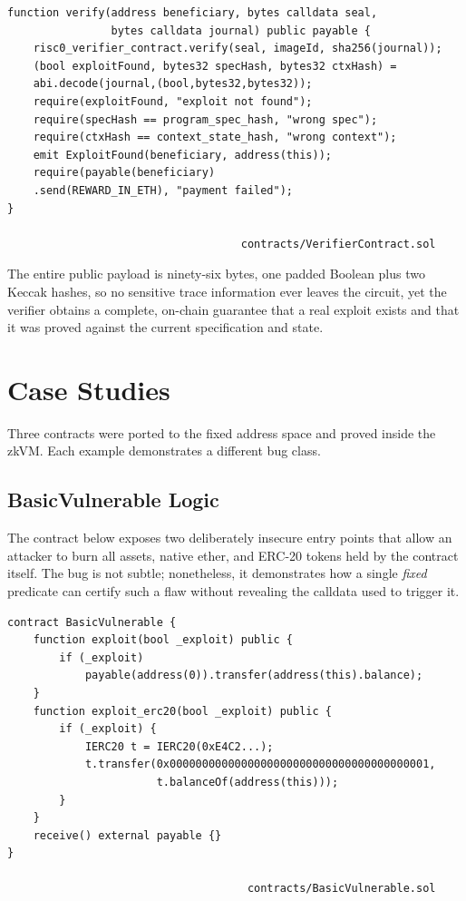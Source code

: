\begin{lstlisting}[caption={[VerifierContract.verify]},label={lst:solver},language=Solidity]
function verify(address beneficiary, bytes calldata seal,
                bytes calldata journal) public payable {
    risc0_verifier_contract.verify(seal, imageId, sha256(journal));
    (bool exploitFound, bytes32 specHash, bytes32 ctxHash) = 
    abi.decode(journal,(bool,bytes32,bytes32));
    require(exploitFound, "exploit not found");
    require(specHash == program_spec_hash, "wrong spec");
    require(ctxHash == context_state_hash, "wrong context");
    emit ExploitFound(beneficiary, address(this));
    require(payable(beneficiary)
    .send(REWARD_IN_ETH), "payment failed");
}

                                    contracts/VerifierContract.sol
\end{lstlisting}

The entire public payload is ninety-six bytes, one padded Boolean plus two Keccak hashes, so no sensitive trace information ever leaves the circuit, yet the verifier obtains a complete, on-chain guarantee that a real exploit exists and that it was proved against the current specification and state.


\section{Case Studies}\makeatletter{}\makeatother
\label{case_studies}

Three contracts were ported to the fixed address space and proved inside the
zkVM.  Each example demonstrates a different bug class.

\subsection{BasicVulnerable Logic} \label{basicVulnerable}

The contract below exposes two deliberately insecure entry points that allow an attacker to burn all assets, native ether, and ERC-20 tokens held by the contract itself. The bug is not subtle; nonetheless, it demonstrates how a single \textit{fixed} predicate can certify such a flaw without revealing the calldata used to trigger it.

\begin{lstlisting}[caption={[BasicVulnerable.sol]},language=Solidity]
contract BasicVulnerable {
    function exploit(bool _exploit) public {
        if (_exploit)
            payable(address(0)).transfer(address(this).balance);
    }
    function exploit_erc20(bool _exploit) public {
        if (_exploit) {
            IERC20 t = IERC20(0xE4C2...);
            t.transfer(0x0000000000000000000000000000000000000001,
                       t.balanceOf(address(this)));
        }
    }
    receive() external payable {}
}
                        
                                     contracts/BasicVulnerable.sol                
\end{lstlisting}

